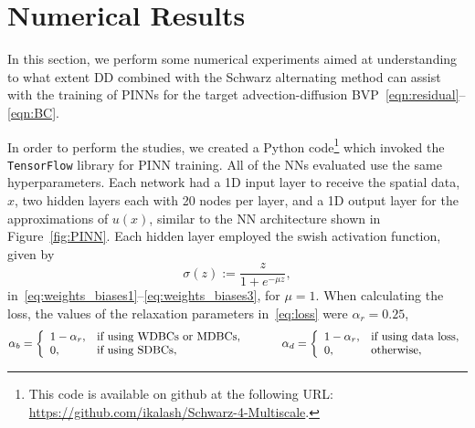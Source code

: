 \documentclass[oneside,final]{csri23}
\begin{document}
\section{Numerical Results} \label{WDS:sec_numerical}

In this section, we perform some numerical experiments aimed at understanding to what extent DD combined with the Schwarz alternating method can assist with the training of PINNs for the target advection-diffusion BVP~\eqref{eqn:residual}--\eqref{eqn:BC}.  

In order to perform the studies, we created a Python code\footnote{This code is available on github at the following URL: \url{https://github.com/ikalash/Schwarz-4-Multiscale}.} which invoked the {\tt TensorFlow} library \cite{WDS:Tensorflow} for PINN training. All of the NNs evaluated use the same hyperparameters. Each network had a 1D input layer to receive the spatial data, $x$, two hidden layers each with 20 nodes per layer, and a 1D output layer for the approximations of $u(x)$, similar to the NN architecture shown in Figure~\ref{fig:PINN}. Each hidden layer employed the swish activation function, given by  
\begin{equation}
    \sigma(z) := \frac{z}{1+e^{-\mu z}},
\end{equation}
in~\eqref{eq:weights_biases1}--\eqref{eq:weights_biases3}, for $\mu = 1$. When calculating the loss, the values of the relaxation parameters in~\eqref{eq:loss} were $\alpha_r=0.25$, 
\begin{equation}
    \alpha_b = \left\{
    \begin{array}[h]{ll}
        1 - \alpha_r, & \text{if using WDBCs or MDBCs},\\
        0, & \text{if using SDBCs},
    \end{array}\right. \hspace{1cm} 
    \alpha_d = \left\{
    \begin{array}[h]{ll}
        1-\alpha_r, & \text{if using data loss},\\
        0, & \text{otherwise},
    \end{array}\right.
\end{equation}
\end{document}
